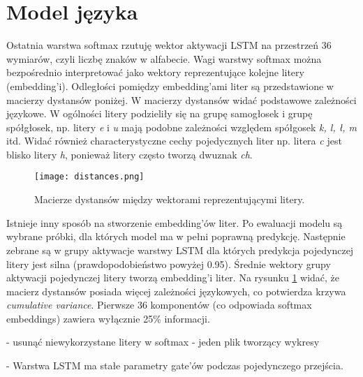 
\section{Model języka}

Ostatnia warstwa softmax rzutuję wektor aktywacji LSTM na przestrzeń 36 wymiarów, czyli
liczbę znaków w alfabecie.
Wagi warstwy softmax można bezpośrednio interpretować jako wektory reprezentujące kolejne litery (embedding'i).
Odległości pomiędzy embedding'ami liter są przedstawione w macierzy dystansów poniżej.
W macierzy dystansów widać podstawowe zależności językowe.
W ogólności litery podzieliły się na grupę samogłosek i grupę spółgłosek, np.
litery \textit{e} i \textit{u} mają podobne zależności względem spółgosek \textit{k, l, ł, m} itd.
Widać również characterystyczne cechy pojedycznych liter np.
litera \textit{c} jest blisko litery \textit{h}, ponieważ litery często tworzą dwuznak \textit{ch}.

\begin{figure}
    \centering
    \texttt{[image: distances.png]}
    \caption{Macierze dystansów między wektorami reprezentującymi litery.}
    \label{fig:distances}
\end{figure}

Istnieje inny sposób na stworzenie embedding'ów liter.
Po ewaluacji modelu są wybrane próbki, dla których model ma w pełni poprawną predykcję.
Następnie zebrane są w grupy aktywacje warstwy LSTM dla których predykcja pojedynczej
litery jest silna (prawdopodobieństwo powyżej 0.95).
Średnie wektory grupy aktywacji pojedynczej litery tworzą embedding'i liter.
Na rysunku \ref{fig:distances} widać, że macierz dystansów posiada więcej zależności językowych, co
potwierdza krzywa \textit{cumulative variance}.
Pierwsze 36 komponentów (co odpowiada softmax embeddings) zawiera wyłącznie 25\% informacji.





- usunąć niewykorzystane litery w softmax
- jeden plik tworzący wykresy


- Warstwa LSTM ma stałe parametry gate'ów podczas pojedynczego przejścia.
